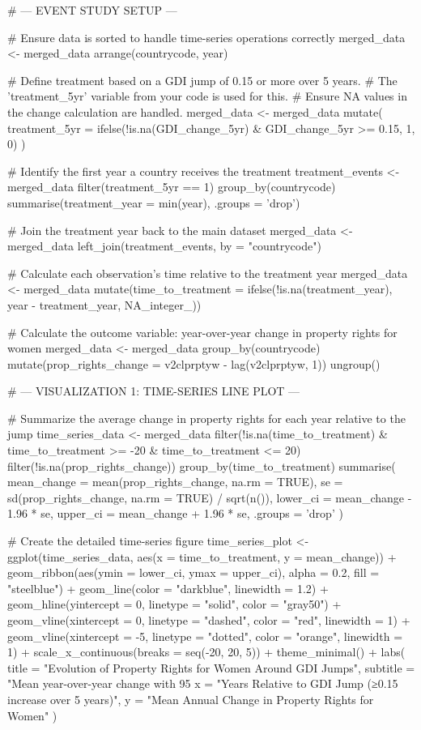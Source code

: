 {{# --- EVENT STUDY SETUP ---

# Ensure data is sorted to handle time-series operations correctly
merged_data <- merged_data %
  arrange(countrycode, year)

# Define treatment based on a GDI jump of 0.15 or more over 5 years.
# The 'treatment_5yr' variable from your code is used for this.
# Ensure NA values in the change calculation are handled.
merged_data <- merged_data %
  mutate(
    treatment_5yr = ifelse(!is.na(GDI_change_5yr) & GDI_change_5yr >= 0.15, 1, 0)
  )

# Identify the first year a country receives the treatment
treatment_events <- merged_data %
  filter(treatment_5yr == 1) %
  group_by(countrycode) %
  summarise(treatment_year = min(year), .groups = 'drop')

# Join the treatment year back to the main dataset
merged_data <- merged_data %
  left_join(treatment_events, by = "countrycode")

# Calculate each observation's time relative to the treatment year
merged_data <- merged_data %
  mutate(time_to_treatment = ifelse(!is.na(treatment_year),
                                      year - treatment_year,
                                      NA_integer_))

# Calculate the outcome variable: year-over-year change in property rights for women
merged_data <- merged_data %
  group_by(countrycode) %
  mutate(prop_rights_change = v2clprptyw - lag(v2clprptyw, 1)) %
  ungroup()

# --- VISUALIZATION 1: TIME-SERIES LINE PLOT ---

# Summarize the average change in property rights for each year relative to the jump
time_series_data <- merged_data %
  filter(!is.na(time_to_treatment) & time_to_treatment >= -20 & time_to_treatment <= 20) %
  filter(!is.na(prop_rights_change)) %
  group_by(time_to_treatment) %
  summarise(
    mean_change = mean(prop_rights_change, na.rm = TRUE),
    se = sd(prop_rights_change, na.rm = TRUE) / sqrt(n()),
    lower_ci = mean_change - 1.96 * se,
    upper_ci = mean_change + 1.96 * se,
    .groups = 'drop'
  )

# Create the detailed time-series figure
time_series_plot <- ggplot(time_series_data, aes(x = time_to_treatment, y = mean_change)) +
  geom_ribbon(aes(ymin = lower_ci, ymax = upper_ci), alpha = 0.2, fill = "steelblue") +
  geom_line(color = "darkblue", linewidth = 1.2) +
  geom_hline(yintercept = 0, linetype = "solid", color = "gray50") +
  geom_vline(xintercept = 0, linetype = "dashed", color = "red", linewidth = 1) +
  geom_vline(xintercept = -5, linetype = "dotted", color = "orange", linewidth = 1) +
  scale_x_continuous(breaks = seq(-20, 20, 5)) +
  theme_minimal() +
  labs(
    title = "Evolution of Property Rights for Women Around GDI Jumps",
    subtitle = "Mean year-over-year change with 95%
    x = "Years Relative to GDI Jump (≥0.15 increase over 5 years)",
    y = "Mean Annual Change in Property Rights for Women"
  )

}}
